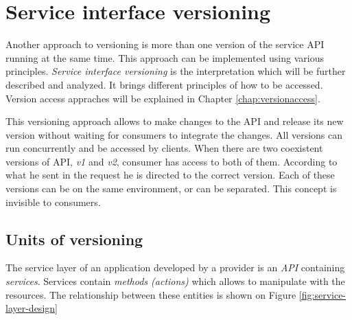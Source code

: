 \section{Service interface versioning}

Another approach to versioning is more than one version of the service API running at the same time. This approach can be implemented using various principles. \emph{Service interface versioning} is the interpretation which will be further described and analyzed. It brings different principles of how to be accessed. Version access appraches will be explained in Chapter \ref{chap:versionaccess}.

This versioning approach allows to make changes to the API and release its new version without waiting for consumers to integrate the changes. All versions can run concurrently and be accessed by clients. When there are two coexistent versions of API, \emph{v1} and \emph{v2}, consumer has access to both of them. According to what he sent in the request he is directed to the correct version. Each of these versions can be on the same environment, or can be separated. This concept is invisible to  consumers.



\subsection{Units of versioning}
\label{sec:units}

The service layer of an application developed by a provider is an \emph{API} containing \emph{services}. Services contain \emph{methods (actions)} which allows to manipulate with the resources. The relationship between these entities is shown on Figure \ref{fig:service-layer-design}

